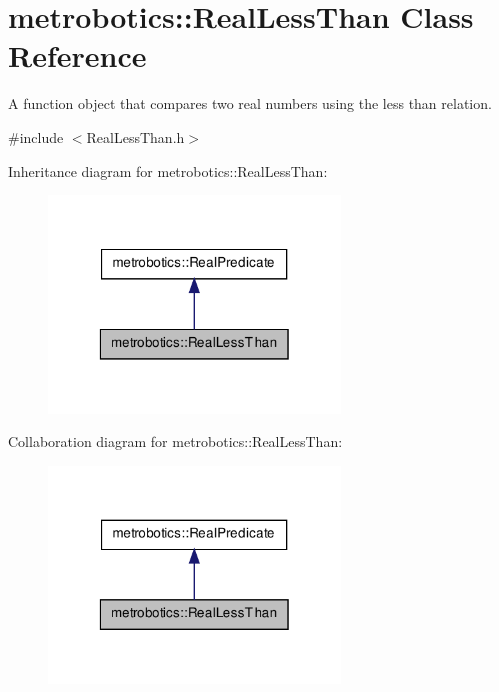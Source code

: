 \hypertarget{classmetrobotics_1_1RealLessThan}{\section{metrobotics\-:\-:\-Real\-Less\-Than \-Class \-Reference}
\label{classmetrobotics_1_1RealLessThan}
}


\-A function object that compares two real numbers using the less than relation.  




{\ttfamily \#include $<$\-Real\-Less\-Than.\-h$>$}



\-Inheritance diagram for metrobotics\-:\-:\-Real\-Less\-Than\-:
\nopagebreak
\begin{figure}[H]
\begin{center}
\leavevmode
\includegraphics[width=220pt]{classmetrobotics_1_1RealLessThan__inherit__graph}
\end{center}
\end{figure}


\-Collaboration diagram for metrobotics\-:\-:\-Real\-Less\-Than\-:
\nopagebreak
\begin{figure}[H]
\begin{center}
\leavevmode
\includegraphics[width=220pt]{classmetrobotics_1_1RealLessThan__coll__graph}
\end{center}
\end{figure}
